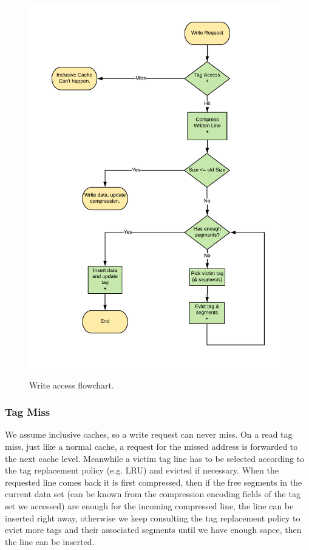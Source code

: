 \begin{figure}
    \includegraphics[width=\textwidth,height=\textheight]{BDI_Write.pdf}
    \label{fig:BDI_Write}
    \caption[BDI Write]{Write access flowchart.}
\end{figure}
\begin{figure}
\end{figure}
\subsubsection{Tag Miss}
We assume inclusive caches, so a write request can never miss. On a read tag miss, just like a normal cache, a request for the missed address is forwarded to the next cache level. Meanwhile a victim tag line has to be selected according to the tag replacement policy (e.g. LRU) and evicted if necessary. When the requested line comes back it is first compressed, then if the free segments in the current data set (can be known from the compression encoding fields of the tag set we accessed) are enough for the incoming compressed line, the line can be inserted right away, otherwise we keep consulting the tag replacement policy to evict more tags and their associated segments until we have enough sapce, then the line can be inserted.

